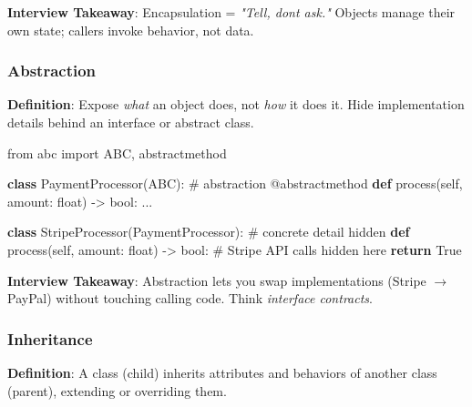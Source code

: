 \documentclass[11pt]{article}
\newenvironment{Shaded}{\begin{snugshade}}{\end{snugshade}}
\newcommand{\AttributeTok}[1]{\textcolor[rgb]{0.16,0.50,0.73}{#1}}
\newcommand{\BuiltInTok}[1]{\textcolor[rgb]{0.50,0.55,0.55}{#1}}
\newcommand{\CommentTok}[1]{\textcolor[rgb]{0.48,0.49,0.49}{#1}}
\newcommand{\ControlFlowTok}[1]{\textcolor[rgb]{0.99,0.74,0.29}{\textbf{#1}}}
\newcommand{\ImportTok}[1]{\textcolor[rgb]{0.15,0.68,0.38}{#1}}
\newcommand{\KeywordTok}[1]{\textcolor[rgb]{0.81,0.81,0.76}{\textbf{#1}}}
\newcommand{\NormalTok}[1]{\textcolor[rgb]{0.81,0.81,0.76}{#1}}
\newcommand{\OperatorTok}[1]{\textcolor[rgb]{0.81,0.81,0.76}{#1}}
\newcommand{\VariableTok}[1]{\textcolor[rgb]{0.15,0.68,0.68}{#1}}
\begin{document}
\textbf{Interview Takeaway}: Encapsulation = \emph{"Tell, don\textquotesingle t ask."} Objects manage their own state; callers invoke behavior, not data.

\subsubsection{Abstraction}\label{abstraction}

\textbf{Definition}: Expose \emph{what} an object does, not \emph{how} it does it. Hide implementation details behind an interface or abstract class.


\begin{Shaded}
\begin{Highlighting}[]
\ImportTok{from}\NormalTok{ abc }\ImportTok{import}\NormalTok{ ABC, abstractmethod}

\KeywordTok{class}\NormalTok{ PaymentProcessor(ABC):          }\CommentTok{\# abstraction}
    \AttributeTok{@abstractmethod}
    \KeywordTok{def}\NormalTok{ process(}\VariableTok{self}\NormalTok{, amount: }\BuiltInTok{float}\NormalTok{) }\OperatorTok{{-}\textgreater{}} \BuiltInTok{bool}\NormalTok{:}
\NormalTok{        ...}

\KeywordTok{class}\NormalTok{ StripeProcessor(PaymentProcessor):  }\CommentTok{\# concrete detail hidden}
    \KeywordTok{def}\NormalTok{ process(}\VariableTok{self}\NormalTok{, amount: }\BuiltInTok{float}\NormalTok{) }\OperatorTok{{-}\textgreater{}} \BuiltInTok{bool}\NormalTok{:}
        \CommentTok{\# Stripe API calls hidden here}
        \ControlFlowTok{return} \VariableTok{True}
\end{Highlighting}
\end{Shaded}

\textbf{Interview Takeaway}: Abstraction lets you swap implementations (Stripe \(\rightarrow\) PayPal) without touching calling code. Think \emph{interface contracts}.

\subsubsection{Inheritance}\label{inheritance}

\textbf{Definition}: A class (child) inherits attributes and behaviors of another class (parent), extending or overriding them.

\end{document}
